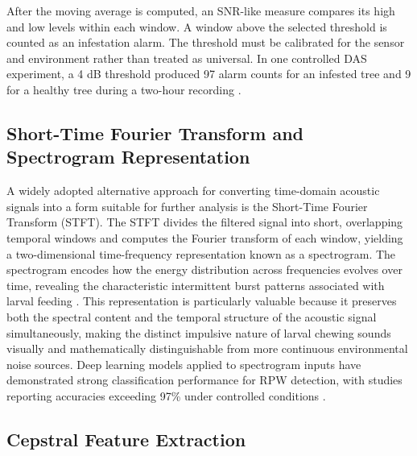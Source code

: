 \documentclass[12pt,a4paper,oneside]{memoir}
\begin{document}
After the moving average is computed, an SNR-like measure compares its high and low levels within each window. A window above the selected threshold is counted as an infestation alarm. The threshold must be calibrated for the sensor and environment rather than treated as universal. In one controlled DAS experiment, a 4 dB threshold produced 97 alarm counts for an infested tree and 9 for a healthy tree during a two-hour recording \cite{ashry2020}.

\subsection{Short-Time Fourier Transform and Spectrogram Representation}

A widely adopted alternative approach for converting time-domain acoustic signals into a form suitable for further analysis is the Short-Time Fourier Transform (STFT). The STFT divides the filtered signal into short, overlapping temporal windows and computes the Fourier transform of each window, yielding a two-dimensional time-frequency representation known as a spectrogram. The spectrogram encodes how the energy distribution across frequencies evolves over time, revealing the characteristic intermittent burst patterns associated with larval feeding \cite{pinhas2008,rach2013}. This representation is particularly valuable because it preserves both the spectral content and the temporal structure of the acoustic signal simultaneously, making the distinct impulsive nature of larval chewing sounds visually and mathematically distinguishable from more continuous environmental noise sources. Deep learning models applied to spectrogram inputs have demonstrated strong classification performance for RPW detection, with studies reporting accuracies exceeding 97\% under controlled conditions \cite{boulila2023}.

\subsection{Cepstral Feature Extraction}
\end{document}
